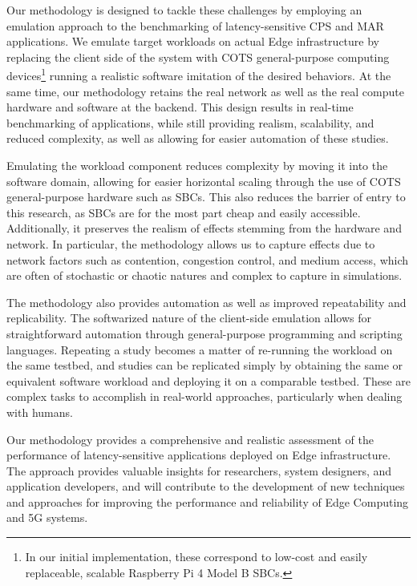 Our methodology is designed to tackle these challenges by employing an emulation approach to the benchmarking of latency-sensitive \gls{CPS} and \gls{MAR} applications. 
We emulate target workloads on actual Edge infrastructure by replacing the client side of the system with \gls{COTS} general-purpose computing devices\footnote{%
    In our initial implementation, these correspond to low-cost and easily replaceable, scalable Raspberry Pi 4 Model B \acsp{SBC}.
} running a realistic software imitation of the desired behaviors.
At the same time, our methodology retains the real network as well as the real compute hardware and software at the backend.
This design results in real-time benchmarking of applications, while still providing realism, scalability, and reduced complexity, as well as allowing for easier automation of these studies.

Emulating the workload component reduces complexity by moving it into the software domain, allowing for easier horizontal scaling through the use of \gls{COTS} general-purpose hardware such as \glspl{SBC}.
This also reduces the barrier of entry to this research, as \glspl{SBC} are for the most part cheap and easily accessible.
Additionally, it preserves the realism of effects stemming from the hardware and network.
In particular, the methodology allows us to capture effects due to network factors such as contention, congestion control, and medium access, which are often of stochastic or chaotic natures and complex to capture in simulations.

The methodology also provides automation as well as improved repeatability and replicability.
The softwarized nature of the client-side emulation allows for straightforward automation through general-purpose programming and scripting languages.
Repeating a study becomes a matter of re-running the workload on the same testbed, and studies can be replicated simply by obtaining the same or equivalent software workload and deploying it on a comparable testbed.
These are complex tasks to accomplish in real-world approaches, particularly when dealing with humans.

Our methodology provides a comprehensive and realistic assessment of the performance of latency-sensitive applications deployed on Edge infrastructure.
The approach provides valuable insights for researchers, system designers, and application developers, and will contribute to the development of new techniques and approaches for improving the performance and reliability of Edge Computing and 5G systems.


